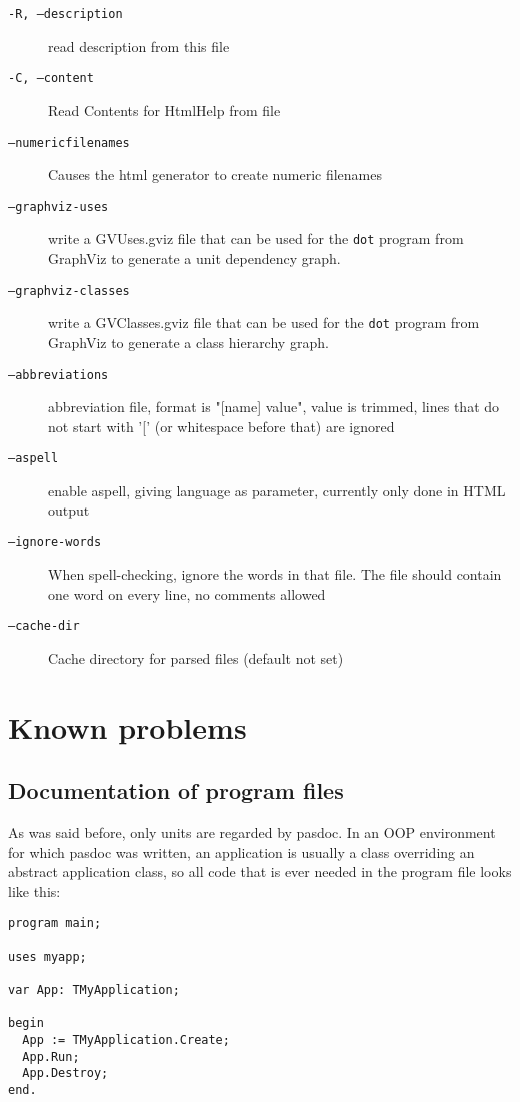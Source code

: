 \documentclass[11pt]{article}
\begin{document}
\begin{description}
\item[{\tt -R, --description}] read description from this file
\item[{\tt -C, --content}] Read Contents for HtmlHelp from file
\item[{\tt --numericfilenames}] Causes the html generator to create numeric filenames
\item[{\tt --graphviz-uses}] write a GVUses.gviz file that can be used for the 
{\tt dot} program from GraphViz to generate a unit dependency graph.
\item[{\tt --graphviz-classes}] write a GVClasses.gviz file that can be used for the 
{\tt dot} program from GraphViz to generate a class hierarchy graph.
\item[{\tt --abbreviations}] abbreviation file, format is "[name]  value", value 
is trimmed, lines that do not start with '[' (or whitespace before that) are ignored
\item[{\tt --aspell}] enable aspell, giving language as parameter, currently only done in HTML output
\item[{\tt --ignore-words}] When spell-checking, ignore the words in that file. 
The file should contain one word on every line, no comments allowed
\item[{\tt --cache-dir}] Cache directory for parsed files (default not set)
\end{description}

\section{Known problems}

\subsection{Documentation of program files}

As was said before, only units are regarded by pasdoc.
In an OOP environment for which pasdoc was written, an application is
usually a class overriding an abstract application class, so all
code that is ever needed in the program file looks like this:

\begin{verbatim}
program main;

uses myapp;

var App: TMyApplication;

begin
  App := TMyApplication.Create;
  App.Run;
  App.Destroy;
end.
\end{verbatim}
\end{document}
